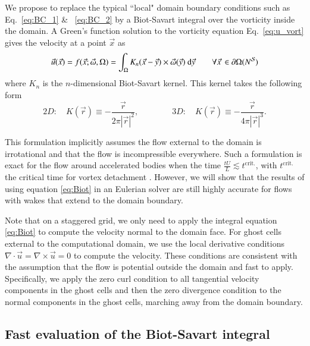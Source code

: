 \documentclass[preprint,12pt]{elsarticle}
\begin{document}
We propose to replace the typical ``local" domain boundary conditions such as Eq.~\eqref{eq:BC_1} \& ~\eqref{eq:BC_2} by a Biot-Savart integral over the vorticity inside the domain. A Green's function solution to the vorticity equation Eq.~\eqref{eq:u_vort} gives the velocity at a point $\vec x$ as
\begin{equation}\label{eq:Biot}
    {\vec u}({\vec x}) = f(\vec x; \vec\omega,\Omega) = \int_\Omega K_{n}({\vec x} - \vec{y})\times \vec\omega({\vec y})\text{ d}\vec{y} \quad\quad \forall \vec x\, \in \partial\Omega (N^{\cal S})
\end{equation}
where $K_n$ is the $n$-dimensional Biot-Savart kernel. This kernel takes the following form \cite{Eldredge2019MathematicalFlows}
\begin{equation}
    2D:\quad K(\vec r)\equiv -\frac{\vec{r}}{2\pi|\vec{r}|^2}, \qquad\qquad 3D:\quad K(\vec r)\equiv -\frac{\vec{r}}{4\pi|\vec{r}|^3}.
\end{equation}

This formulation implicitly assumes the flow external to the domain is irrotational and that the flow is incompressible everywhere. Such a formulation is exact for the flow around accelerated bodies when the time $\frac{tU}{L}\lesssim t^{\text{crit.}}$, with $t^{\text{crit.}}$ the critical time for vortex detachment \cite{Shusser2000EnergyRing}. However, we will show that the results of using equation \eqref{eq:Biot} in an Eulerian solver are still highly accurate for flows with wakes that extend to the domain boundary. 

Note that on a staggered grid, we only need to apply the integral equation \eqref{eq:Biot} to compute the velocity normal to the domain face. For ghost cells external to the computational domain, we use the local derivative conditions $\nabla\cdot\vec{u} = \nabla\times\vec{u}=0$ to compute the velocity. These conditions are consistent with the assumption that the flow is potential outside the domain and fast to apply. Specifically, we apply the zero curl condition to all tangential velocity components in the ghost cells and then the zero divergence condition to the normal components in the ghost cells, marching away from the domain boundary.


\subsection{Fast evaluation of the Biot-Savart integral}
\end{document}
